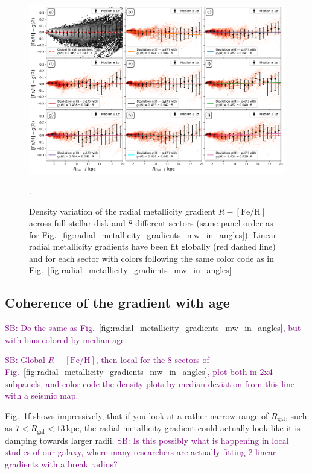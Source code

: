 \documentclass[fleqn,usenatbib]{mnras}
\newcommand{\SB}[1]{{\textcolor{purple}{SB: #1}}}
\begin{document}
\begin{figure}
    \centering
    \includegraphics[width=\textwidth]{figures/linear_radial_metallicity_gradients_mw_in_angles.png}
    \caption{Density variation of the radial metallicity gradient $R-\mathrm{[Fe/H]}$ across full stellar disk and 8 different sectors (same panel order as for Fig.~\ref{fig:radial_metallicity_gradients_mw_in_angles}). Linear radial metallicity gradients have been fit globally (red dashed line) and for each sector with colors following the same color code as in Fig.~\ref{fig:radial_metallicity_gradients_mw_in_angles}}.
    \label{fig:linear_radial_metallicity_gradients_mw_in_angles}
\end{figure}

\subsection{Coherence of the gradient with age}
\label{sec:coherence_age_radial_metallicity_gradients}

\SB{Do the same as Fig.~\ref{fig:radial_metallicity_gradients_mw_in_angles}, but with bins colored by median age.}

\SB{Global $R-\mathrm{[Fe/H]}$, then local for the 8 sectors of Fig.~\ref{fig:radial_metallicity_gradients_mw_in_angles}, plot both in 2x4 subpanels, and color-code the density plots by median deviation from this line with a seismic map.}



Fig.~\ref{fig:linear_radial_metallicity_gradients_mw_in_angles}f shows impressively, that if you look at a rather narrow range of $R_\mathrm{gal}$, such as $7 < R_\mathrm{gal} < 13\,\mathrm{kpc}$, the radial metallicity gradient could actually look like it is damping towards larger radii. \SB{Is this possibly what is happening in local studies of our galaxy, where many researchers are actually fitting 2 linear gradients with a break radius?}
\end{document}
